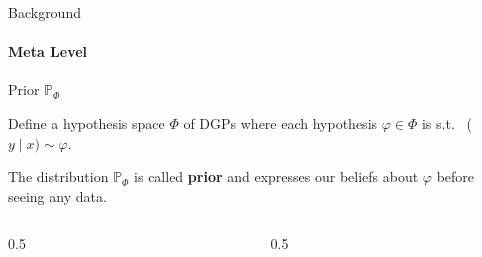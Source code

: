 \begin{frame}{Background}
  \framesubtitle{Meta Level}

  \small
  \begin{block}{Prior $\mathbb{P}_\Phi$}
    \begin{center}
      Define a hypothesis space $\Phi$ of DGPs where each hypothesis $\varphi \in \Phi$ is s.t. \ ($y \mid x) \sim \varphi$.
    \end{center}

    \vspace{-1.5em}
    \begin{center}
      The distribution $\mathbb{P}_\Phi$ is called \textbf{prior} and expresses our beliefs about $\varphi$ before seeing any data.
    \end{center}
  \end{block}

  \begin{columns}[T]
    \begin{column}{0.5\textwidth}
      \centering
      {\footnotesize $ $}\\[0.2em]
    \end{column}
    \begin{column}{0.5\textwidth}
      \centering
      {\footnotesize $ $}\\[0.2em]
    \end{column}
  \end{columns}
\end{frame}


